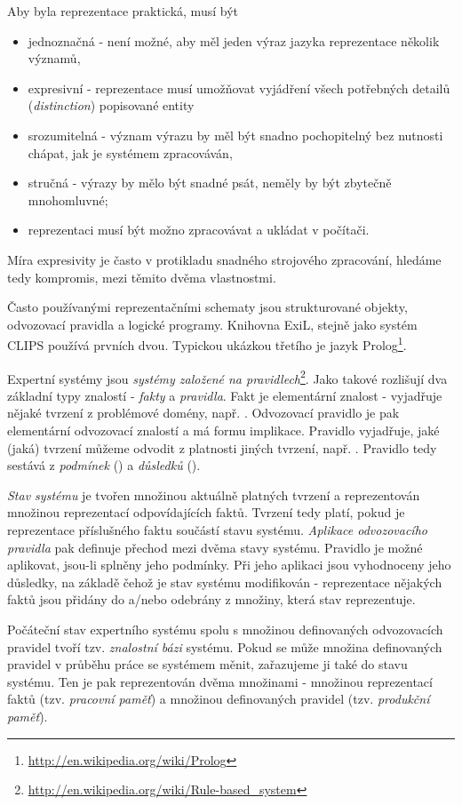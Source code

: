 Aby byla reprezentace praktická, musí být
\begin{itemize}
  \item jednoznačná - není možné, aby měl jeden výraz jazyka reprezentace
    několik významů,
  \item expresivní - reprezentace musí umožňovat vyjádření všech potřebných
    detailů (\emph{distinction}) popisované entity
  \item srozumitelná - význam výrazu by měl být snadno pochopitelný bez
    nutnosti chápat, jak je systémem zpracováván,
  \item stručná - výrazy by mělo být snadné psát, neměly by být zbytečně
    mnohomluvné;
  \item reprezentaci musí být možno zpracovávat a ukládat v počítači.
\end{itemize}
Míra expresivity je často v protikladu snadného strojového zpracování, hledáme
tedy kompromis, mezi těmito dvěma vlastnostmi.

Často používanými reprezentačními schematy jsou strukturované objekty,
odvozovací pravidla a logické programy. Knihovna ExiL, stejně jako systém CLIPS
používá prvních dvou. Typickou ukázkou třetího je jazyk
Prolog\footnote{\url{http://en.wikipedia.org/wiki/Prolog}}.

Expertní systémy jsou \emph{systémy založené na
pravidlech}\footnote{\url{http://en.wikipedia.org/wiki/Rule-based\_system}}.
Jako takové rozlišují dva základní typy znalostí - \emph{fakty} a
\emph{pravidla}. Fakt je elementární  znalost - vyjadřuje nějaké
tvrzení z problémové domény, např. . Odvozovací pravidlo je
pak elementární odvozovací znalostí a má formu implikace. Pravidlo vyjadřuje,
jaké (jaká) tvrzení můžeme odvodit z platnosti jiných tvrzení, např. . Pravidlo tedy sestává z \emph{podmínek} () a \emph{důsledků} ().

\emph{Stav systému} je tvořen množinou aktuálně platných tvrzení a reprezentován
množinou reprezentací odpovídajících faktů. Tvrzení tedy platí, pokud je
reprezentace příslušného faktu součástí stavu systému. \emph{Aplikace
odvozovacího pravidla} pak definuje přechod mezi dvěma stavy systému. Pravidlo
je možné aplikovat, jsou-li splněny jeho podmínky. Při jeho aplikaci jsou
vyhodnoceny jeho důsledky, na základě čehož je stav systému modifikován -
reprezentace nějakých faktů jsou přidány do a/nebo odebrány z množiny, která
stav reprezentuje.

Počáteční stav expertního systému spolu s množinou definovaných odvozovacích
pravidel tvoří tzv. \emph{znalostní bázi} systému. Pokud se může množina
definovaných pravidel v průběhu práce se systémem měnit, zařazujeme ji také do
stavu systému. Ten je pak reprezentován dvěma množinami - množinou reprezentací
faktů (tzv. \emph{pracovní paměť}) a množinou definovaných pravidel (tzv.
\emph{produkční paměť}).

